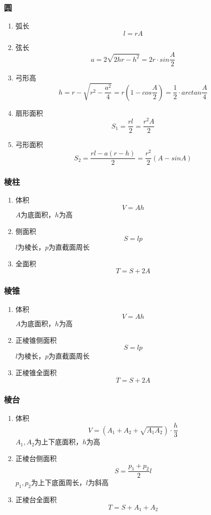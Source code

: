 \documentclass[a4paper]{ctexart}
\begin{document}
\subsubsection{圆}

\begin{enumerate}
	\item 弧长
	$$l=rA$$
	\item 弦长
	$$a=2\sqrt{2hr-h^2}=2r\cdot sin\frac{A}{2}$$
	\item 弓形高
	$$h=r-\sqrt{r^2-\frac{a^2}{4}}=r(1-cos\frac{A}{2})=\frac{1}{2} \cdot arctan\frac{A}{4}$$
	\item 扇形面积
	$$S_1=\frac{rl}{2}=\frac{r^2A}{2}$$
	\item 弓形面积
	$$S_2=\frac{rl-a(r-h)}{2}=\frac{r^2}{2}(A-sinA)$$
\end{enumerate}

\subsubsection{棱柱}

\begin{enumerate}
	\item 体积
	$$V=Ah$$
	$A$为底面积，$h$为高
	\item 侧面积
	$$S=lp$$
	$l$为棱长，$p$为直截面周长
	\item 全面积
	$$T=S+2A$$
\end{enumerate}

\subsubsection{棱锥}

\begin{enumerate}
	\item 体积
	$$V=Ah$$
	$A$为底面积，$h$为高
	\item 正棱锥侧面积
	$$S=lp$$
	$l$为棱长，$p$为直截面周长
	\item 正棱锥全面积
	$$T=S+2A$$
\end{enumerate}

\subsubsection{棱台}

\begin{enumerate}
	\item 体积
	$$V=(A_1+A_2+\sqrt{A_1A_2}) \cdot \frac{h}{3}$$
	$A_1,A_2$为上下底面积，$h$为高
	\item 正棱台侧面积
	$$S=\frac{p_1+p_2}{2}l$$
	$p_1,p_2$为上下底面周长，$l$为斜高
	\item 正棱台全面积
	$$T=S+A_1+A_2$$
\end{enumerate}
\end{document}
